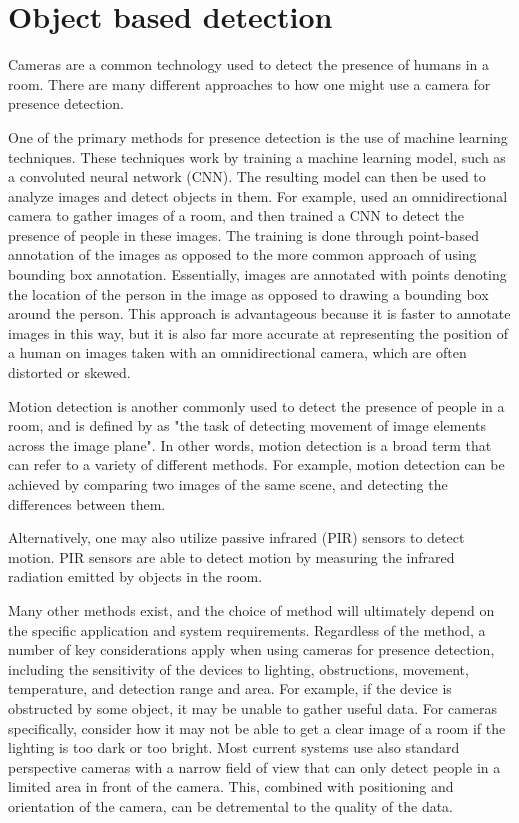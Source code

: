 \section{Object based detection} \label{sec:object-based-detection}
Cameras are a common technology used to detect the presence of humans in a room.
There are many different approaches to how one might use a camera for presence detection.

One of the primary methods for presence detection is the use of machine learning techniques.
These techniques work by training a machine learning model, such as a convoluted neural network (CNN).
The resulting model can then be used to analyze images and detect objects in them.
For example, \citeauthor{FUERTES2022103473} used an omnidirectional camera to gather images of a room, and then trained a CNN to detect the presence of people in these images.
The training is done through point-based annotation of the images as opposed to the more common approach of using bounding box annotation.
Essentially, images are annotated with points denoting the location of the person in the image as opposed to drawing a bounding box around the person.
This approach is advantageous because it is faster to annotate images in this way, but it is also far more accurate at representing the position of a human on images taken with an omnidirectional camera, which are often distorted or skewed.\cite{FUERTES2022103473}

Motion detection is another commonly used to detect the presence of people in a room, and is defined by \citeauthor{ANANDAN1988347} as "the task of detecting movement of image elements across the image plane".
In other words, motion detection is a broad term that can refer to a variety of different methods.
For example, motion detection can be achieved by comparing two images of the same scene, and detecting the differences between them\cite{granath_detecting_nodate}.

Alternatively, one may also utilize passive infrared (PIR) sensors to detect motion.
PIR sensors are able to detect motion by measuring the infrared radiation emitted by objects in the room.\cite{Deiana2014}

Many other methods exist, and the choice of method will ultimately depend on the specific application and system requirements. 
Regardless of the method, a number of key considerations apply when using cameras for presence detection, including the sensitivity of the devices to lighting, obstructions, movement, temperature, and detection range and area.
For example, if the device is obstructed by some object, it may be unable to gather useful data.
For cameras specifically, consider how it may not be able to get a clear image of a room if the lighting is too dark or too bright.
Most current systems use also standard perspective cameras with a narrow field of view that can only detect people in a limited area in front of the camera\cite{FUERTES2022103473}.
This, combined with positioning and orientation of the camera, can be detremental to the quality of the data.\cite{granath_detecting_nodate, tang_occupancy_2020}

